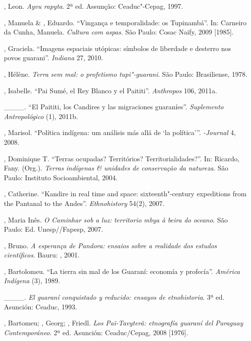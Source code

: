 \begin{Parskip}
, Leon. \emph{Ayvu rapyta}. 2ª ed. Assunção: Ceaduc"-Cepag, 1997.

, Manuela \& , Eduardo.
``Vingança e temporalidade: os Tupinambá''. In: Carneiro da Cunha,
Manuela. \emph{Cultura com aspas}. São Paulo: Cosac Naify, 2009 [1985].

, Graciela. ``Imagens espaciais utópicas: símbolos de
liberdade e desterro nos povos guarani''. \emph{Indiana} 27, 2010. 

, Hélène. \emph{Terra sem mal: o profetismo tupi"-guarani}. São
Paulo: Brasiliense, 1978.

, Isabelle. ``Pai Sumé, el Rey Blanco y el Paititi''. \emph{Anthropos}
106, 2011a.

\_\_\_\_. ``El Paititi, los Candires y las migraciones guaraníes''.
\emph{Suplemento Antropológico}  (1), 2011b.

, Marisol. ``Política indígena: um análisis más allá de
‘la política’''. \emph{-Journal} 4, 2008.

, Dominique T. ``Terras ocupadas? Territórios?
Territorialidades?''. In: Ricardo, Fany. (Org.). \emph{Terras indígenas \&
unidades de conservação da natureza}. São Paulo: Instituto
Socioambiental, 2004.

, Catherine. ``Kandire in real time and space:
sixteenth"-century expeditions from the Pantanal to the Andes''.
\emph{Ethnohistory} 54(2), 2007.

, Maria Inês. \emph{O Caminhar sob a luz: territorio mbya à beira
do oceano}. São Paulo: Ed. Unesp//Fapesp, 2007.

, Bruno. \emph{A esperança de Pandora: ensaios sobre a realidade
dos estudos científicos}. Bauru: , 2001.

, Bartolomeu. ``La tierra sin mal de los Guaraní: economía y
profecía''. \emph{América Indígena}  (3), 1989.

\_\_\_\_. \emph{El guaraní conquistado y reducido: ensayos de etnohistoria}.
3ª ed. Asunción: Ceaduc, 1993.

, Bartomeu; , Georg; , Friedl. \emph{Los
Paĩ-Tavyterã: etnografía guaraní del Paraguay Contemporáneo}. 2ª
ed. Asunción: Ceaduc/Cepag, 2008 [1976].


\end{Parskip}

